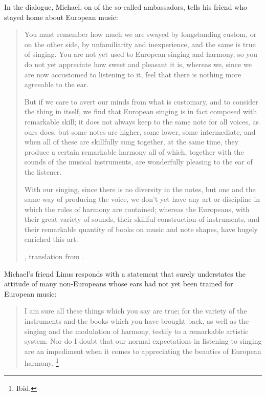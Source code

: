 In the dialogue, Michael, on of the so-called ambassadors, tells his friend who stayed home about European music:
\begin{quotation}
  You must remember \Dots{} how much we are swayed by longstanding custom, or on the other side, by unfamiliarity and inexperience, and the same is true of singing. 
  You are not yet used to European singing and harmony, so you do not yet appreciate how sweet and pleasant it is, whereas we, since we are now accustomed to listening to it, feel that there is nothing more agreeable to the ear.

  But if we care to avert our minds from what is customary, and to consider the thing in itself, we find that European singing is in fact composed with remarkable skill; it does not always keep to the same note for all voices, as ours does, but some notes are higher, some lower, some intermediate, and when all of these are skillfully sung together, at the same time, they produce a certain remarkable harmony \Dots{} all of which, \Dots{} together with the sounds of the musical instruments, are wonderfully pleasing to the ear of the listener. \Dots{}

  With our singing, since there is no diversity in the notes, but one and the same way of producing the voice, we don't yet have any art or discipline in which the rules of harmony are contained; whereas the Europeans, with their great variety of sounds, their skillful construction of instruments, and their remarkable quantity of books on music and note shapes, have hugely enriched this art.%
  \begin{Footnote}
    \Autocite[109--110]{Sande:DeMissioneLegatorum}, translation from \autocite[155-156]{Massarella:JapaneseTravellers}.
    \end{Footnote}
\end{quotation}
Michael's friend Linus responds with a statement that surely understates the attitude of many non-Europeans whose ears had not yet been trained for European music:
\begin{quote}
  I am sure all these things which you say are true; for the variety of the instruments and the books which you have brought back, as well as the singing and the modulation of harmony, testify to a remarkable artistic system.
  Nor do I doubt that our normal expectations in listening to singing are an impediment when it comes to appreciating the beauties of European harmony.%
  \footnote{Ibid.}
\end{quote}



